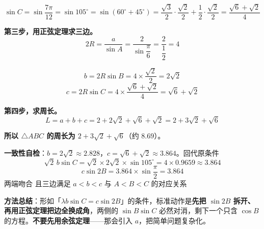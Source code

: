 \begin{answer}
\nopagebreak[4]
\[\sin C=\sin\frac{7\pi}{12}=\sin105^{\circ}=\sin\left(60^{\circ}+45^{\circ}\right)=\frac{\sqrt3}2\cdot\frac{\sqrt2}2+\frac12\cdot\frac{\sqrt2}2=\frac{\sqrt6+\sqrt2}4\]

\textbf{第三步，用正弦定理求三边。}
\nopagebreak[4]
\[2R=\frac a{\sin A}=\frac2{\sin\dfrac\pi6}=\frac2{\dfrac12}=4\]

\nopagebreak[4]
\[b=2R\sin B=4\times\frac{\sqrt2}2=2\sqrt2\]
\nopagebreak[4]
\[c=2R\sin C=4\times\frac{\sqrt6+\sqrt2}4=\sqrt6+\sqrt2\]

\textbf{第四步，求周长。}
\nopagebreak[4]
\[L=a+b+c=2+2\sqrt2+\sqrt6+\sqrt2=2+3\sqrt2+\sqrt6\]

\textbf{所以 $\triangle ABC$ 的周长为 $2+3\sqrt2+\sqrt6$}（约 $8.69$）。

\begin{gktip}
\textbf{一致性自检}：$b=2\sqrt2\approx2.828$，$c=\sqrt6+\sqrt2\approx3.864$。回代原条件
\nopagebreak[4]
\[\sqrt2\,b\sin C=\sqrt2\times2\sqrt2\times\sin105^{\circ}=4\times0.9659\approx3.864\]
\nopagebreak[4]
\[c\sin2B=3.864\times\sin\frac\pi2=3.864\]
两端吻合  且三边满足 $a<b<c$ 与 $A<B<C$ 的对应关系 

\textbf{方法总结}：形如「$\lambda b\sin C=c\sin2B$」的条件，标准动作是\textbf{先把 $\sin2B$ 拆开、再用正弦定理把边全换成角}，两侧的 $\sin B\sin C$ 必然对消，剩下一个只含 $\cos B$ 的方程。\textbf{不要先用余弦定理}——那会引入 $a$，把简单问题复杂化。
\end{gktip}



\par\medskip

\end{answer}
